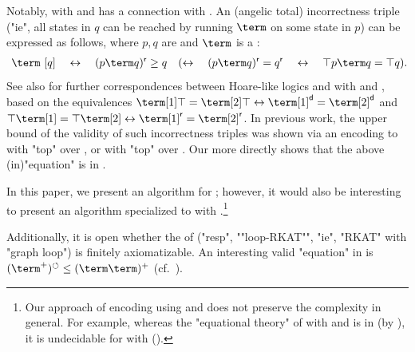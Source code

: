\documentclass[a4paper,UKenglish,cleveref, autoref, thm-restate]{lipics-v2021}
\newcommand{\dom}{\mathsf{d}}
\newcommand{\rng}{\mathsf{r}}
\newcommand{\lop}{\circlearrowleft}
\begin{document}
\begin{scope}
%
%
%

Notably,  with  and  has a connection with \intro*{} \cite{ohearnIncorrectnessLogic2019}.
%
An (angelic total) incorrectness triple ("ie", all states in $q$ can be reached by running $\term$ on some state in $p$)
can be expressed as follows, where $p, q$ are  and $\term$ is a :
\begin{gather*}
[p]~\term~[q] \quad\leftrightarrow\quad (p \term q)^{\rng} \ge q \quad(\leftrightarrow\quad (p \term q)^{\rng} = q^{\rng} \quad\leftrightarrow\quad \top p \term q = \top q).
\end{gather*}
See also \cite[Table 2]{verschtTaxonomyHoareLikeLogics2025} for further correspondences between Hoare-like logics and  with  and , based on the equivalences $\term[1] \top = \term[2] \top \leftrightarrow \term[1]^{\dom} = \term[2]^{\dom}$ and $\top \term[1] = \top \term[2] \leftrightarrow \term[1]^{\rng} = \term[2]^{\rng}$.
In previous work, the  upper bound of the validity of such incorrectness triples was shown via an encoding to  with "top" over  \cite{nakamuraExistentialCalculiRelations2023,pousCompletenessTheoremsKleene2024}, or  with "top" over  \cite{zhangDomainReasoningTopKAT2024}.
Our  more directly shows that the above (in)"equation" is in .

In this paper, we present an algorithm for ; however,
it would also be interesting to present an algorithm specialized to  with .\footnote{%
Our approach of encoding  using  and  does not preserve the complexity in general.
For example, whereas the "equational theory" of  with  and 
is in  (by \cite{lutzPDLNegationAtomic2005}), it is undecidable for  with  \cite{nakamuraExistentialCalculiRelations2023,nakamuraUndecidabilityEmptinessProblem2025} ().}

Additionally, it is open whether the  of  ("resp", ""loop-RKAT"", "ie",
"RKAT" with "graph loop") is finitely axiomatizable.
An interesting valid "equation" in  is $(\term^{+})^{\lop} \le (\term \term)^{+}$ (cf.~\cite[p.~14]{pousPositiveCalculusRelations2018}).

%
%
%


\end{scope}
\end{document}
